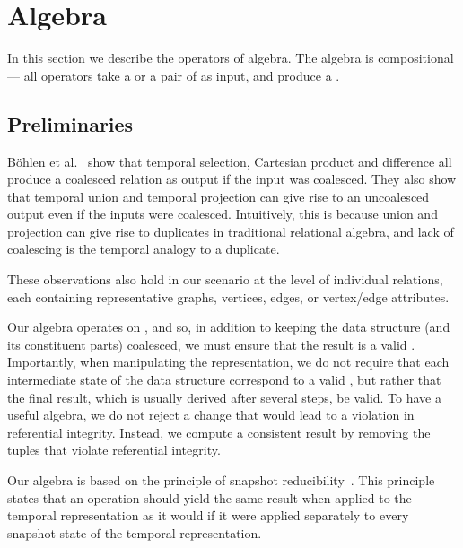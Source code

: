 \section{Algebra}
\label{sec:algebra}
In this section we describe the operators of \tg algebra.  The algebra
is compositional --- all operators take a \tg or a pair of \tgs as
input, and produce a \tg.

\subsection{Preliminaries}
\label{sec:algebra:prelim}

B\"ohlen et al.~\cite{DBLP:conf/vldb/BohlenSS96} show that temporal
selection, Cartesian product and difference all produce a coalesced
relation as output if the input was coalesced.  They also show that
temporal union and temporal projection can give rise to an uncoalesced
output even if the inputs were coalesced.  Intuitively, this is
because union and projection can give rise to duplicates in
traditional relational algebra, and lack of coalescing is the temporal
analogy to a duplicate.

These observations also hold in our scenario at the level of
individual relations, each containing representative graphs, vertices,
edges, or vertex/edge attributes.

Our algebra operates on \tgs, and so, in addition to keeping the data
structure (and its constituent parts) coalesced, we must ensure that
the result is a valid \tg.  Importantly, when manipulating the \ve
representation, we do not require that each intermediate state of the
data structure correspond to a valid \tg, but rather that the final
result, which is usually derived after several steps, be valid.  To
have a useful algebra, we do not reject a change that would lead to a
violation in referential integrity.  Instead, we compute a consistent
result by removing the tuples that violate referential integrity.

Our algebra is based on the principle of snapshot
reducibility~\cite{DBLP:reference/db/Bohlen092}.  This principle
states that an operation should yield the same result when applied to
the temporal representation as it would if it were applied separately
to every snapshot state of the temporal representation.


